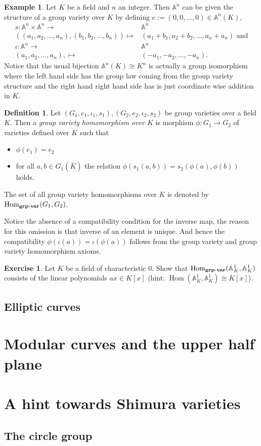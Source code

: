 \documentclass[a4paper,12pt,reqno]{amsart}
\newcommand{\field}[1]{\mathbb{#1}}  %
\newcommand{\A}{\field{A}}
\newcommand{\HomGrpVar}{\text{Hom}_{\bf grp\text{-}var}}
\DeclareMathOperator{\Hom}{Hom}
\theoremstyle{definition}
\newtheorem{definition}[lemma]{Definition}
\newtheorem{example}[lemma]{Example}
\newtheorem{exercise}[lemma]{Exercise}
\numberwithin{lemma}{section}
\numberwithin{equation}{section}
\numberwithin{figure}{section}
\begin{document}
\begin{example}
Let $K$ be a field and $n$ an integer. Then $\A^n$ can be given the structure of a group variety over $K$ by defining $e:=(0,0,\ldots,0) \in \A^n(K)$, 
\begin{align}
s \colon  \A^n \times \A^n \to& \A^n \\
((a_1,a_2,\ldots, a_n),(b_1,b_2,\ldots, b_n)) \mapsto& (a_1+b_1,a_2+b_2,\ldots, a_n+a_n) \text{ and} \\
\iota \colon  \A^n  \to& \A^n \\
(a_1,a_2,\ldots, a_n), \mapsto& (-a_1,-a_2,\ldots, -a_n).
\end{align}
Notice that the usual bijection $\A^n(K) \cong K^n$ is actually a group isomorphism where the left hand side has the group law coming from the group variety structure and the right hand right hand side has is just coordinate wise addition in $K$.
\end{example}

\begin{definition}\label{def:group-variety-homomorphism}
Let $(G_1,e_1,\iota_1,s_1), (G_2,e_2,\iota_2,s_2)$ be group varieties over  a field $K$. Then a \textit{group variety homomorphism over $K$} is morphism $\phi: G_1 \to G_2$ of varieties defined over $K$ such that
\begin{itemize}
	\item $\phi(e_1)=e_2$
	\item for all $a,b \in G_1(\overline K)$ the relation $\phi(s_1(a,b)) = s_2(\phi(a),\phi(b))$ holds.
\end{itemize}
The set of all group variety homomorphisms over $K$ is denoted by $\HomGrpVar(G_1,G_2)$.
\end{definition}
Notice the absence of a compatibility condition for the inverse map, the reason for this omission is that inverse of an element is unique. And hence the compatibility $\phi(\iota(a))=\iota(\phi(a))$ follows from the group variety and group variety homomorphism axioms.


\begin{exercise}
Let $K$ be a field of characteristic $0$. Show that $\HomGrpVar(\A^1_K, \A^1_K)$ consists of the linear polynomials $ax \in K[x]$ (hint: $\Hom(\A^1_K, \A^1_K) \cong K[x]$). 
\end{exercise}

\subsection{Elliptic curves}

\section{Modular curves and the upper half plane}


\section{A hint towards Shimura varieties}

\subsection{The circle group}




{}
\end{document}
